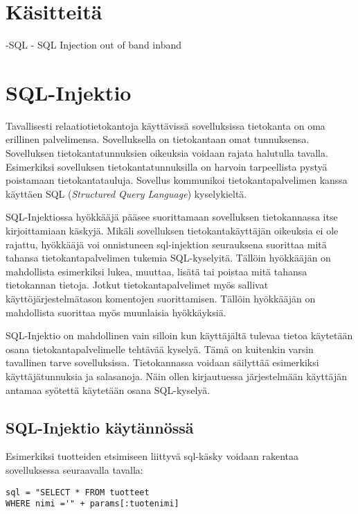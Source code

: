 \documentclass[finnish]{tktltiki2}
\theoremstyle{definition}
\theoremstyle{remark}
\begin{document}
\section{Käsitteitä}
-SQL
- SQL Injection
out of band
inband
\pagebreak



\section{SQL-Injektio}
Tavallisesti relaatiotietokantoja käyttävissä sovelluksissa tietokanta on oma erillinen palvelimensa. Sovelluksella on tietokantaan omat tunnuksensa. Sovelluksen tietokantatunnuksien oikeuksia voidaan rajata halutulla tavalla. Esimerkiksi sovelluksen tietokantatunnuksilla on harvoin tarpeellista pystyä poistamaan tietokantatauluja. Sovellus kommunikoi tietokantapalvelimen kanssa käyttäen SQL (\textit{Structured Query Language}) kyselykieltä.

SQL-Injektiossa hyökkääjä pääsee suorittamaan sovelluksen tietokannassa itse kirjoittamiaan käskyjä. Mikäli sovelluksen tietokantakäyttäjän oikeuksia ei ole rajattu, hyökkääjä voi onnistuneen sql-injektion seurauksena suorittaa mitä tahansa tietokantapalvelimen tukemia SQL-kyselyitä. Tällöin hyökkääjän on mahdollista esimerkiksi lukea, muuttaa, lisätä tai poistaa mitä tahansa tietokannan tietoja. Jotkut tietokantapalvelimet myös sallivat käyttöjärjestelmätason komentojen suorittamisen. Tällöin hyökkääjän on mahdollista suorittaa myös muunlaisia hyökkäyksiä. 

SQL-Injektio on mahdollinen vain silloin kun käyttäjältä tulevaa tietoa käytetään osana tietokantapalvelimelle tehtävää kyselyä. Tämä on kuitenkin varsin tavallinen tarve sovelluksissa. Tietokannassa voidaan säilyttää esimerkiksi käyttäjätunnuksia ja salasanoja. Näin ollen kirjautuessa järjestelmään käyttäjän antamaa syötettä käytetään osana SQL-kyselyä.

\subsection{SQL-Injektio käytännössä}

Esimerkiksi tuotteiden etsimiseen liittyvä sql-käsky voidaan rakentaa sovelluksessa seuraavalla tavalla:

\begin{lstlisting}
sql = "SELECT * FROM tuotteet
WHERE nimi ='" + params[:tuotenimi]
\end{lstlisting}
\end{document}
